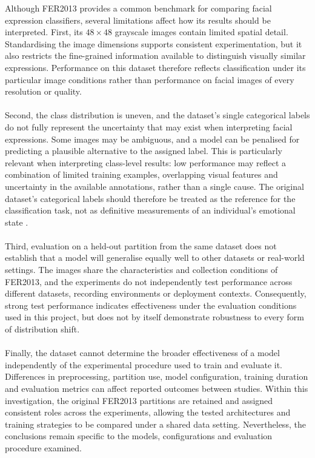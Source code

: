 \documentclass[12pt, a4paper]{report}
\begin{document}
				Although FER2013 provides a common benchmark for comparing facial expression classifiers, several limitations affect how its results should be interpreted. First, its $48\times48$ grayscale images contain limited spatial detail. Standardising the image dimensions supports consistent experimentation, but it also restricts the fine-grained information available to distinguish visually similar expressions. Performance on this dataset therefore reflects classification under its particular image conditions rather than performance on facial images of every resolution or quality.\\\\
				Second, the class distribution is uneven, and the dataset's single categorical labels do not fully represent the uncertainty that may exist when interpreting facial expressions. Some images may be ambiguous, and a model can be penalised for predicting a plausible alternative to the assigned label. This is particularly relevant when interpreting class-level results: low performance may reflect a combination of limited training examples, overlapping visual features and uncertainty in the available annotations, rather than a single cause. The original dataset's categorical labels should therefore be treated as the reference for the classification task, not as definitive measurements of an individual's emotional state \cite{goodfellow2015challenges, Barsoum2016FERPlus}.\\\\
				Third, evaluation on a held-out partition from the same dataset does not establish that a model will generalise equally well to other datasets or real-world settings. The images share the characteristics and collection conditions of FER2013, and the experiments do not independently test performance across different datasets, recording environments or deployment contexts. Consequently, strong test performance indicates effectiveness under the evaluation conditions used in this project, but does not by itself demonstrate robustness to every form of distribution shift.\\\\
				Finally, the dataset cannot determine the broader effectiveness of a model independently of the experimental procedure used to train and evaluate it. Differences in preprocessing, partition use, model configuration, training duration and evaluation metrics can affect reported outcomes between studies. Within this investigation, the original FER2013 partitions are retained and assigned consistent roles across the experiments, allowing the tested architectures and training strategies to be compared under a shared data setting. Nevertheless, the conclusions remain specific to the models, configurations and evaluation procedure examined.\\\\
\end{document}
